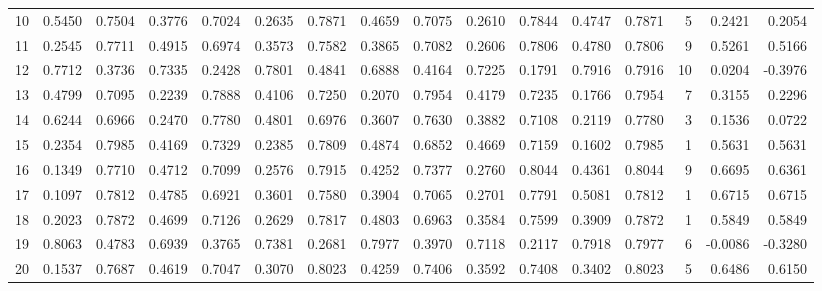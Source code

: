 \begin{tabular}{lrrrrrrrrrrrrrrr}
10  &      0.5450 &  0.7504 &  0.3776 &  0.7024 &  0.2635 &  0.7871 &  0.4659 &  0.7075 &  0.2610 &  0.7844 &   0.4747 &     0.7871 &      5 &                    0.2421 &                     0.2054 \\
11  &      0.2545 &  0.7711 &  0.4915 &  0.6974 &  0.3573 &  0.7582 &  0.3865 &  0.7082 &  0.2606 &  0.7806 &   0.4780 &     0.7806 &      9 &                    0.5261 &                     0.5166 \\
12  &      0.7712 &  0.3736 &  0.7335 &  0.2428 &  0.7801 &  0.4841 &  0.6888 &  0.4164 &  0.7225 &  0.1791 &   0.7916 &     0.7916 &     10 &                    0.0204 &                    -0.3976 \\
13  &      0.4799 &  0.7095 &  0.2239 &  0.7888 &  0.4106 &  0.7250 &  0.2070 &  0.7954 &  0.4179 &  0.7235 &   0.1766 &     0.7954 &      7 &                    0.3155 &                     0.2296 \\
14  &      0.6244 &  0.6966 &  0.2470 &  0.7780 &  0.4801 &  0.6976 &  0.3607 &  0.7630 &  0.3882 &  0.7108 &   0.2119 &     0.7780 &      3 &                    0.1536 &                     0.0722 \\
15  &      0.2354 &  0.7985 &  0.4169 &  0.7329 &  0.2385 &  0.7809 &  0.4874 &  0.6852 &  0.4669 &  0.7159 &   0.1602 &     0.7985 &      1 &                    0.5631 &                     0.5631 \\
16  &      0.1349 &  0.7710 &  0.4712 &  0.7099 &  0.2576 &  0.7915 &  0.4252 &  0.7377 &  0.2760 &  0.8044 &   0.4361 &     0.8044 &      9 &                    0.6695 &                     0.6361 \\
17  &      0.1097 &  0.7812 &  0.4785 &  0.6921 &  0.3601 &  0.7580 &  0.3904 &  0.7065 &  0.2701 &  0.7791 &   0.5081 &     0.7812 &      1 &                    0.6715 &                     0.6715 \\
18  &      0.2023 &  0.7872 &  0.4699 &  0.7126 &  0.2629 &  0.7817 &  0.4803 &  0.6963 &  0.3584 &  0.7599 &   0.3909 &     0.7872 &      1 &                    0.5849 &                     0.5849 \\
19  &      0.8063 &  0.4783 &  0.6939 &  0.3765 &  0.7381 &  0.2681 &  0.7977 &  0.3970 &  0.7118 &  0.2117 &   0.7918 &     0.7977 &      6 &                   -0.0086 &                    -0.3280 \\
20  &      0.1537 &  0.7687 &  0.4619 &  0.7047 &  0.3070 &  0.8023 &  0.4259 &  0.7406 &  0.3592 &  0.7408 &   0.3402 &     0.8023 &      5 &                    0.6486 &                     0.6150 \\

\end{tabular}
